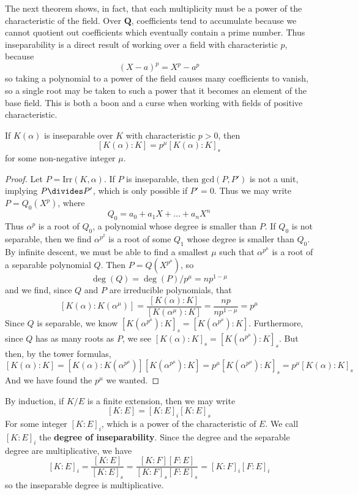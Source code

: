 The next theorem shows, in fact, that each multiplicity must be a power of the characteristic of the field. Over $\mathbf{Q}$, coefficients tend to accumulate because we cannot quotient out coefficients which eventually contain a prime number. Thus inseparability is a direct result of working over a field with characteristic $p$, because
%
\[ (X - a)^p = X^p - a^p \]
%
so taking a polynomial to a power of the field causes many coefficients to vanish, so a single root may be taken to such a power that it becomes an element of the base field. This is both a boon and a curse when working with fields of positive characteristic.

\begin{theorem}
    If $K(\alpha)$ is inseparable over $K$ with characteristic $p > 0$, then
    \[ [K(\alpha): K] = p^\mu[K(\alpha): K]_s \]
    for some non-negative integer $\mu$.
\end{theorem}
\begin{proof}
    Let $P = \text{Irr}(K,\alpha)$. If $P$ is inseparable, then $\text{gcd}(P,P')$ is not a unit, implying $P \divides P'$, which is only possible if $P' = 0$. Thus we may write $P = Q_0(X^p)$, where
    \[ Q_0 = a_0 + a_1 X + \dots + a_n X^n \]
    Thus $\alpha^p$ is a root of $Q_0$, a polynomial whose degree is smaller than $P$. If $Q_0$ is not separable, then we find $\alpha^{p^2}$ is a root of some $Q_1$ whose degree is smaller than $Q_0$. By infinite descent, we must be able to find a smallest $\mu$ such that $\alpha^{p^\mu}$ is a root of a separable polynomial $Q$. Then $P = Q(X^{p^\mu})$, so
    \[ \deg(Q) = \deg(P)/p^\mu = np^{1-\mu} \]
    and we find, since $Q$ and $P$ are irreducible polynomials, that
    \[ [K(\alpha) : K(\alpha^\mu)] = \frac{[K(\alpha): K]}{[K(\alpha^\mu): K]} = \frac{np}{np^{1-\mu}} = p^\mu \]
    Since $Q$ is separable, we know $[K(\alpha^{p^\mu}): K]_s = [K(\alpha^{p^\mu}): K]$. Furthermore, since $Q$ has as many roots as $P$, we see $[K(\alpha): K]_s = [K(\alpha^{p^\mu}): K]_s$. But then, by the tower formulas,
    \[ [K(\alpha): K] = [K(\alpha): K(\alpha^{p^\mu})][K(\alpha^{p^\mu}): K] = p^\mu[K(\alpha^{p^\mu}): K]_s = p^\mu[K(\alpha): K]_s \]
    And we have found the $p^\mu$ we wanted.
\end{proof}

By induction, if $K/E$ is a finite extension, then we may write
%
\[ [K:E] = [K:E]_i [K:E]_s \]
%
For some integer $[K:E]_i$, which is a power of the characteristic of $E$. We call $[K:E]_i$ the {\bf degree of inseparability}. Since the degree and the separable degree are multiplicative, we have
%
\[ [K:E]_i = \frac{[K:E]}{[K:E]_s} = \frac{[K:F][F:E]}{[K:F]_s[F:E]_s} = [K:F]_i [F:E]_i \]
%
so the inseparable degree is multiplicative.

